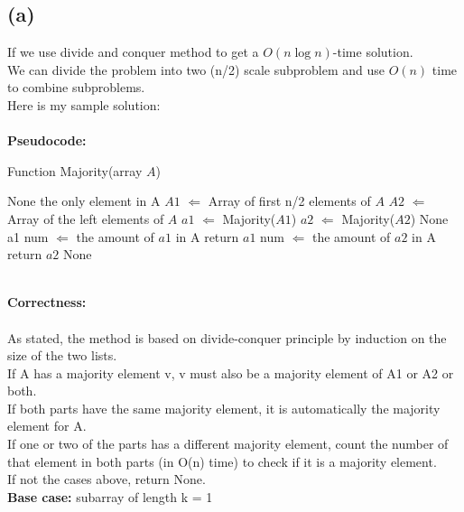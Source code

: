 \documentclass{article}
\begin{document}
\subsection{(a)}
If we use divide and conquer method to get a $O(n\log n)$-time solution.\\
We can divide the problem into two (n/2) scale subproblem and use $O(n)$ time to combine subproblems.\\
Here is my sample solution:\\\\
\textbf{\large Pseudocode:}
\begin{algorithm}
  \caption{Function Majority(array $A$)}
  \label{alg1}
  \begin{algorithmic}
  \RETURN None
  \ENDIF
  \RETURN the only element in A
  \ENDIF
  \STATE $A1$ $\Longleftarrow$ Array of first n/2 elements of $A$
  \STATE $A2$ $\Longleftarrow$ Array of the left elements of $A$
  \STATE $a1$ $\Longleftarrow$ Majority($A1$)
  \STATE $a2$ $\Longleftarrow$ Majority($A2$)
  \RETURN None
  \RETURN a1
  \STATE num $\Longleftarrow$ the amount of $a1$ in A
  \STATE return $a1$
  \ENDIF
  \STATE num $\Longleftarrow$ the amount of $a2$ in A
  \STATE return $a2$
  \ENDIF
  \ELSE\RETURN None
  \ENDIF
  \end{algorithmic}
\end{algorithm}\\
\textbf{\large Correctness:}\\\\
As stated, the method is based on divide-conquer principle by induction on the size of the two lists.\\
If A has a majority element v, v must also be a majority element of A1 or A2 or both.\\
If both parts have the same majority element, it is automatically the majority element for A.\\ If one or two of the parts has a different majority element, count the number of that element in both parts (in O(n) time) to check if it is a majority element.\\
If not the cases above, return None.\\
\textbf{Base case:} subarray of length k = 1\\
\end{document}
